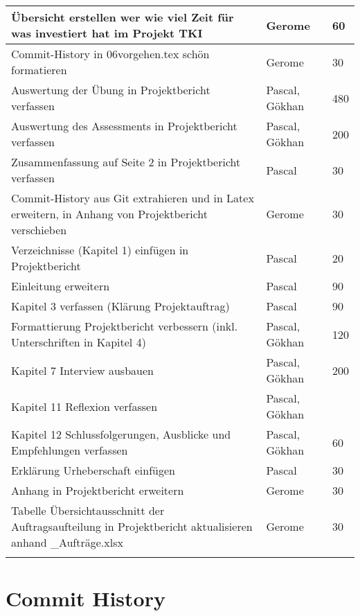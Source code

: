 \begin{longtable}{ | p{7cm} | p{4cm} | p{2cm} |}
    Übersicht erstellen wer wie viel Zeit für was investiert hat im Projekt TKI & Gerome & 60\\ \hline   
    Commit-History in 06vorgehen.tex schön formatieren & Gerome & 30 \\ \hline 
    Auswertung der Übung in Projektbericht verfassen  & Pascal, Gökhan & 480 \\ \hline   
Auswertung des Assessments in Projektbericht verfassen & Pascal, Gökhan & 200 \\ \hline  
Zusammenfassung auf Seite 2 in Projektbericht verfassen     & Pascal & 30 \\ \hline   
Commit-History aus Git extrahieren und in Latex erweitern, in Anhang von Projektbericht verschieben     & Gerome & 30 \\ \hline
 Verzeichnisse (Kapitel 1) einfügen in Projektbericht    & Pascal & 20 \\ \hline  
 Einleitung erweitern    & Pascal & 90 \\ \hline   
 Kapitel 3 verfassen (Klärung Projektauftrag)    & Pascal & 90 \\ \hline
 Formattierung Projektbericht verbessern (inkl. Unterschriften in Kapitel 4)    & Pascal, Gökhan & 120 \\ \hline  
 Kapitel 7 Interview ausbauen  & Pascal, Gökhan & 200 \\ \hline   
 Kapitel 11 Reflexion verfassen & Pascal, Gökhan &  \\ \hline    
 Kapitel 12 Schlussfolgerungen, Ausblicke und Empfehlungen    verfassen & Pascal, Gökhan & 60 \\ \hline  
 Erklärung Urheberschaft einfügen & Pascal & 30 \\ \hline   
 Anhang in Projektbericht erweitern & Gerome & 30 \\ \hline     
 Tabelle Übersichtausschnitt der Auftragsaufteilung in Projektbericht aktualisieren anhand \_Aufträge.xlsx    & Gerome & 30 \\ \hline    
     &  &  \\ \hline  
     
\end{longtable}
     
\newpage

\section*{Commit History}
 


